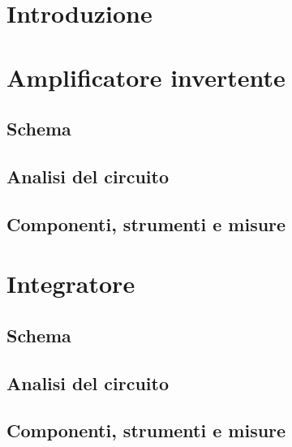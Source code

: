 \documentclass{report}
\begin{document}
\section{Introduzione} 
\section{Amplificatore invertente} 
\subsection{Schema} %
\subsection{Analisi del circuito} 
\subsection{Componenti, strumenti e misure} 
\section{Integratore} 
\subsection{Schema} %
\subsection{Analisi del circuito} 
\subsection{Componenti, strumenti e misure} 





\end{document}
